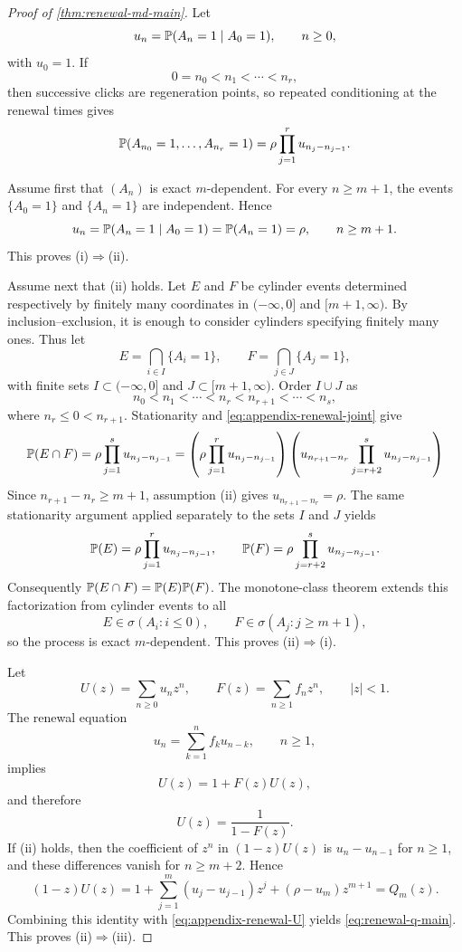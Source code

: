 \begin{proof}[Proof of \cref{thm:renewal-md-main}]
Let
\[
u_n=\mathbb{P}(A_n=1\mid A_0=1),
\qquad n\ge0,
\]
with $u_0=1$. If
\[
0=n_0<n_1<\cdots<n_r,
\]
then successive clicks are regeneration points, so repeated conditioning at the renewal times gives
\begin{equation}\label{eq:appendix-renewal-joint}
\mathbb{P}(A_{n_0}=1,\dots,A_{n_r}=1)
=
\rho\prod_{j=1}^{r}u_{n_j-n_{j-1}}.
\end{equation}

Assume first that $(A_n)$ is exact $m$-dependent. For every $n\ge m+1$, the events $\{A_0=1\}$ and $\{A_n=1\}$ are independent. Hence
\[
u_n
=
\mathbb{P}(A_n=1\mid A_0=1)
=
\mathbb{P}(A_n=1)
=
\rho,
\qquad n\ge m+1.
\]
This proves \textup{(i)}$\Rightarrow$\textup{(ii)}.

Assume next that \textup{(ii)} holds. Let $E$ and $F$ be cylinder events determined respectively by finitely many coordinates in $(-\infty,0]$ and $[m+1,\infty)$. By inclusion--exclusion, it is enough to consider cylinders specifying finitely many ones. Thus let
\[
E=\bigcap_{i\in I}\{A_i=1\},
\qquad
F=\bigcap_{j\in J}\{A_j=1\},
\]
with finite sets $I\subset(-\infty,0]$ and $J\subset[m+1,\infty)$. Order $I\cup J$ as
\[
n_0<n_1<\cdots<n_r<n_{r+1}<\cdots<n_s,
\]
where $n_r\le0<n_{r+1}$. Stationarity and \eqref{eq:appendix-renewal-joint} give
\[
\mathbb{P}(E\cap F)
=
\rho\prod_{j=1}^{s}u_{n_j-n_{j-1}}
=
\left(\rho\prod_{j=1}^{r}u_{n_j-n_{j-1}}\right)
\left(u_{n_{r+1}-n_r}\prod_{j=r+2}^{s}u_{n_j-n_{j-1}}\right)
\]
Since $n_{r+1}-n_r\ge m+1$, assumption \textup{(ii)} gives $u_{n_{r+1}-n_r}=\rho$. The same stationarity argument applied separately to the sets $I$ and $J$ yields
\[
\mathbb{P}(E)=\rho\prod_{j=1}^{r}u_{n_j-n_{j-1}},
\qquad
\mathbb{P}(F)=\rho\prod_{j=r+2}^{s}u_{n_j-n_{j-1}}.
\]
Consequently $\mathbb{P}(E\cap F)=\mathbb{P}(E)\mathbb{P}(F)$.
The monotone-class theorem extends this factorization from cylinder events to all
\[
E\in\sigma(A_i:i\le0),
\qquad
F\in\sigma(A_j:j\ge m+1),
\]
so the process is exact $m$-dependent. This proves \textup{(ii)}$\Rightarrow$\textup{(i)}.

Let
\[
U(z)=\sum_{n\ge0}u_n z^n,
\qquad
F(z)=\sum_{n\ge1}f_n z^n,
\qquad |z|<1.
\]
The renewal equation
\[
u_n=\sum_{k=1}^{n}f_k u_{n-k},
\qquad n\ge1,
\]
implies
\[
U(z)=1+F(z)U(z),
\]
and therefore
\begin{equation}\label{eq:appendix-renewal-U}
U(z)=\frac{1}{1-F(z)}.
\end{equation}
If \textup{(ii)} holds, then the coefficient of $z^n$ in $(1-z)U(z)$ is $u_n-u_{n-1}$ for $n\ge1$, and these differences vanish for $n\ge m+2$. Hence
\[
(1-z)U(z)
=
1+\sum_{j=1}^{m}(u_j-u_{j-1})z^j+(\rho-u_m)z^{m+1}
=
Q_m(z).
\]
Combining this identity with \eqref{eq:appendix-renewal-U} yields \eqref{eq:renewal-q-main}. This proves \textup{(ii)}$\Rightarrow$\textup{(iii)}.


\end{proof}
